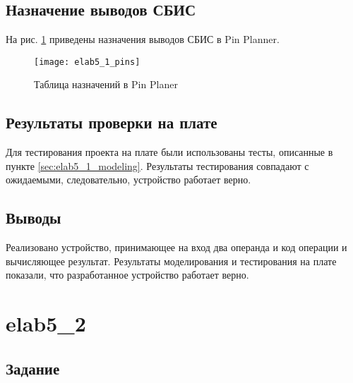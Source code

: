 \subsection{Назначение выводов СБИС}

На рис. \ref{fig:elab5_1_pins} приведены назначения выводов СБИС в Pin Planner.

\begin{figure}[H]
\begin{center}
	\texttt{[image: elab5\_1\_pins]}
	\caption{Таблица назначений в Pin Planer}
	\label{fig:elab5_1_pins}
\end{center}
\end{figure}

\subsection{Результаты проверки на плате}

Для тестирования проекта на плате были использованы тесты, описанные в пункте \ref{sec:elab5_1_modeling}. Результаты тестирования совпадают с ожидаемыми, следовательно, устройство работает верно.

\subsection{Выводы}

Реализовано устройство, принимающее на вход два операнда и код операции и вычисляющее результат. Результаты моделирования и тестирования на плате показали, что разработанное устройство работает верно.

\newpage

\section{elab5\_2}

\subsection{Задание}

